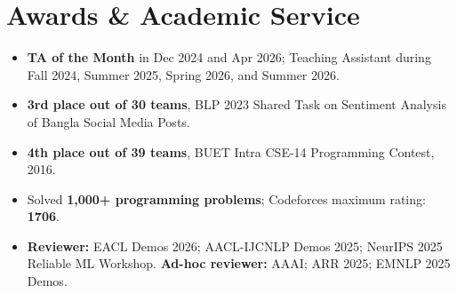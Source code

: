\documentclass[11pt]{extarticle}
\begin{document}
\section*{Awards \& Academic Service}
\begin{itemize}
  \item {\normalsize\textbf{TA of the Month}} {\small in Dec 2024 and Apr 2026; Teaching Assistant during Fall 2024, Summer 2025, Spring 2026, and Summer 2026.}
  \item {\normalsize\textbf{3rd place out of 30 teams}}{\small, BLP 2023 Shared Task on Sentiment Analysis of Bangla Social Media Posts.}
  \item {\normalsize\textbf{4th place out of 39 teams}}{\small, BUET Intra CSE-14 Programming Contest, 2016.}
  \item {\small Solved \textbf{1,000+ programming problems}; Codeforces maximum rating: \textbf{1706}.}
  \item {\normalsize\textbf{Reviewer:}} {\small EACL Demos 2026; AACL-IJCNLP Demos 2025; NeurIPS 2025 Reliable ML Workshop. \textbf{Ad-hoc reviewer:} AAAI; ARR 2025; EMNLP 2025 Demos.}
\end{itemize}
\end{document}
